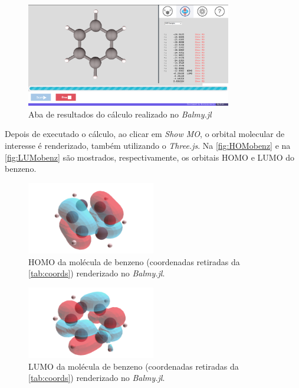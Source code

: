 \begin{figure}[htb]
	\caption{\label{fig:results} Aba de resultados do cálculo realizado no \textit{Balmy.jl}}
	\begin{center}
		\includegraphics[width=0.8\textwidth]{images/results.png}
	\end{center}
\end{figure}

Depois de executado o cálculo, ao clicar em \textit{Show MO}, o orbital molecular de interesse é renderizado, também utilizando o \textit{Three.js}. Na \autoref{fig:HOMobenz} e na \autoref{fig:LUMobenz} são mostrados, respectivamente, os orbitais \gls{HOMO} e \gls{LUMO} do benzeno.

\begin{figure}[htb]
\caption{\label{fig:HOMobenz} \gls{HOMO} da molécula de benzeno (coordenadas retiradas da \autoref{tab:coords}) renderizado no \textit{Balmy.jl}.}
	\begin{center}
		\includegraphics[width=0.5\textwidth]{images/30.png}
	\end{center}
\end{figure}

\begin{figure}[htb]
\caption{\label{fig:LUMobenz} \gls{LUMO} da molécula de benzeno (coordenadas retiradas da \autoref{tab:coords}) renderizado no \textit{Balmy.jl}.}
	\begin{center}
		\includegraphics[width=0.5\textwidth]{images/31.png}
	\end{center}
\end{figure}

